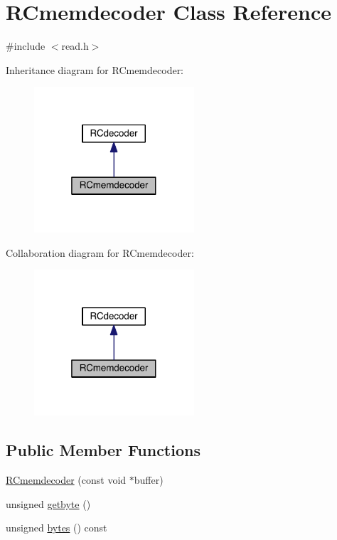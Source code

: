 \hypertarget{class_r_cmemdecoder}{}\section{R\+Cmemdecoder Class Reference}
\label{class_r_cmemdecoder}


{\ttfamily \#include $<$read.\+h$>$}



Inheritance diagram for R\+Cmemdecoder\+:\nopagebreak
\begin{figure}[H]
\begin{center}
\leavevmode
\includegraphics[width=169pt]{d6/d87/class_r_cmemdecoder__inherit__graph}
\end{center}
\end{figure}


Collaboration diagram for R\+Cmemdecoder\+:\nopagebreak
\begin{figure}[H]
\begin{center}
\leavevmode
\includegraphics[width=169pt]{d5/d2d/class_r_cmemdecoder__coll__graph}
\end{center}
\end{figure}
\subsection*{Public Member Functions}
\begin{DoxyCompactItemize}
\item 
\hyperlink{class_r_cmemdecoder_a29b927905d4e95c2da60f0e3800161de}{R\+Cmemdecoder} (const void $\ast$buffer)
\item 
unsigned \hyperlink{class_r_cmemdecoder_a25bb581570acacede24ab7b340d23005}{getbyte} ()
\item 
unsigned \hyperlink{class_r_cmemdecoder_a87da31501a3408c9ba25457f60d7b4b6}{bytes} () const 
\end{DoxyCompactItemize}
